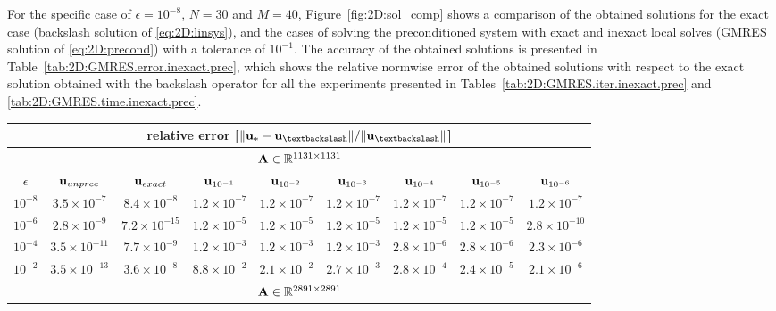 For the specific case of $\epsilon=10^{-8}$, $N=30$ and $M=40$,
Figure~\ref{fig:2D:sol_comp} shows a comparison of the obtained solutions for
the exact case (backslash solution of \eqref{eq:2D:linsys}), and the cases of
solving the preconditioned system with exact and inexact local solves (GMRES
solution of \eqref{eq:2D:precond}) with a tolerance of $10^{-1}$. The accuracy
of the obtained solutions is presented in
Table~\ref{tab:2D:GMRES.error.inexact.prec}, which shows the relative normwise
error of the obtained solutions with respect to the exact solution obtained
with the backslash operator for all the experiments presented in
Tables~\ref{tab:2D:GMRES.iter.inexact.prec} and \ref{tab:2D:GMRES.time.inexact.prec}.

\begin{table}[tbhp]
\hspace*{-2.5cm}
\centering
\vspace*{-0.2em}
\begin{tabular}{r|cccccccc}
\hline
\multicolumn{9}{c}{relative error [$\|\u_{*}-\u_{\textbackslash}\|/\|\u_{\textbackslash}\|$]}\\
\hline
\hline
\multicolumn{9}{c}{$\mathbf{A}\in\mathbb{R}^{1131\times1131}$}\\
\hline
\multicolumn{1}{c|}{$\epsilon$} & $\mathbf{u}_{unprec}$ & $\mathbf{u}_{exact}$ & $\mathbf{u}_{10^{-1}}$ & $\mathbf{u}_{10^{-2}}$ & $\mathbf{u}_{10^{-3}}$ & $\mathbf{u}_{10^{-4}}$ & $\mathbf{u}_{10^{-5}}$ & $\mathbf{u}_{10^{-6}}$\\
\hline
\multicolumn{1}{c|}{$10^{-8}$} & $3.5\times10^{-7}$ & $8.4\times10^{-8}$  & $1.2\times10^{-7}$  & $1.2\times10^{-7}$   & $1.2\times10^{-7}$ & $1.2\times10^{-7}$  & $1.2\times10^{-7}$  & $1.2\times10^{-7}$ \\
\multicolumn{1}{c|}{$10^{-6}$} & $2.8\times10^{-9}$ & $7.2\times10^{-15}$  & $1.2\times10^{-5}$  & $1.2\times10^{-5}$   & $1.2\times10^{-5}$ & $1.2\times10^{-5}$  & $1.2\times10^{-5}$   & $2.8\times10^{-10}$ \\
\multicolumn{1}{c|}{$10^{-4}$} & $3.5\times10^{-11}$ & $7.7\times10^{-9}$  & $1.2\times10^{-3}$  & $1.2\times10^{-3}$   & $1.2\times10^{-3}$ & $2.8\times10^{-6}$  & $2.8\times10^{-6}$   & $2.3\times10^{-6}$ \\
\multicolumn{1}{c|}{$10^{-2}$} & $3.5\times10^{-13}$ & $3.6\times10^{-8}$  & $8.8\times10^{-2}$  & $2.1\times10^{-2}$   & $2.7\times10^{-3}$ & $2.8\times10^{-4}$  & $2.4\times10^{-5}$   & $2.1\times10^{-6}$ \\
\hline
\hline
\multicolumn{9}{c}{$\mathbf{A}\in\mathbb{R}^{2891\times2891}$}\\

\end{tabular}
\end{table}
